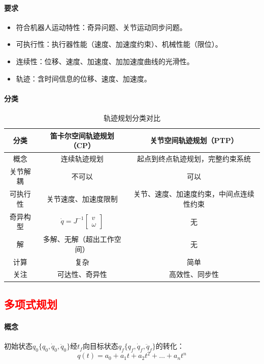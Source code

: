 \documentclass[
12pt, %
a4paper, 
oneside, %
]{scrartcl}
\begin{document}
\paragraph{要求}
\begin{itemize}
\item 符合机器人运动特性：奇异问题、关节运动同步问题。
\item 可执行性：执行器性能（速度、加速度约束）、机械性能（限位）。
\item 连续性：位移、速度、加速度、加加速度曲线的光滑性。
\item 轨迹：含时间信息的位移、速度、加速度。
\end{itemize}
\paragraph{分类}
\begin{table}[H]
\centering
\begin{tabular}{c|c|c}
\hline
分类 & 笛卡尔空间轨迹规划（CP） & 关节空间轨迹规划（PTP） \\
\hline
概念 & 连续轨迹规划 & 起点到终点轨迹规划，完整约束系统 \\
关节解耦 & 不可以 & 可以 \\
可执行性 & 关节速度、加速度限制 & 关节、速度、加速度约束，中间点连续性约束 \\
奇异构型 & $ \dot{q} = J^{-1} \begin{bmatrix} v \\ \omega \end{bmatrix} $ & 无 \\
解 & 多解、无解（超出工作空间） & 无 \\
计算 & 复杂 & 简单 \\
关注 & 可达性、奇异性 & 高效性、同步性 \\
\hline
\end{tabular}
\caption{轨迹规划分类对比}
\end{table}
\subsection[多项式规划]{\textcolor{red}{多项式规划}}
\paragraph{概念}
初始状态$ q_0\{q_0, \dot{q}_0, \ddot{q}_0\} $经$ t_f $向目标状态$ q_f\{q_f, \dot{q}_f, \ddot{q}_f\} $的转化：
$$ q(t) = a_0 + a_1 t + a_2 t^2 + \dots + a_n t^n $$
\end{document}
